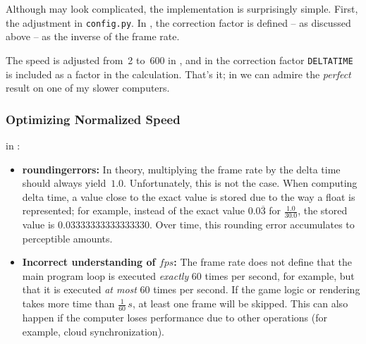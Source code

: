 Although  may look complicated, the implementation is surprisingly simple. First, the adjustment in \texttt{config.py}. In , the correction factor is defined -- as discussed above -- as the inverse of the frame rate. 

\newpage
{}

The speed is adjusted from~2 to~600 in , and in  the correction factor \texttt{DELTATIME} is included as a factor in the calculation. That’s it; in  we can admire the \emph{perfect} result on one of my slower computers.


\newpage
\subsubsection{Optimizing Normalized Speed}

\begin{warningbox} in :
\begin{itemize}
	\item \textbf{\Glspl{roundingerror}:} In theory, multiplying the frame rate by the delta time should always yield~$1.0$. Unfortunately, this is not the case. When computing delta time, a value close to the exact value is stored due to the way a \gls{float} is represented;	for example, instead of the exact value $0.0\overline{3}$ for $\tfrac{1.0}{30.0}$, the stored value is $0.03333333333333330$. Over time, this rounding error accumulates to perceptible amounts.
	
	\item \textbf{Incorrect understanding of $fps$:} The frame rate does not define that the main program loop is executed \emph{exactly} 60 times per second, for example, but that it is executed \emph{at most} 60 times per second. If the game logic or rendering takes more time than $\tfrac{1}{60}\,\si{s}$, at least one frame will be skipped. This can also happen if the computer loses performance due to other operations (for example, cloud synchronization).
\end{itemize}
\end{warningbox}


